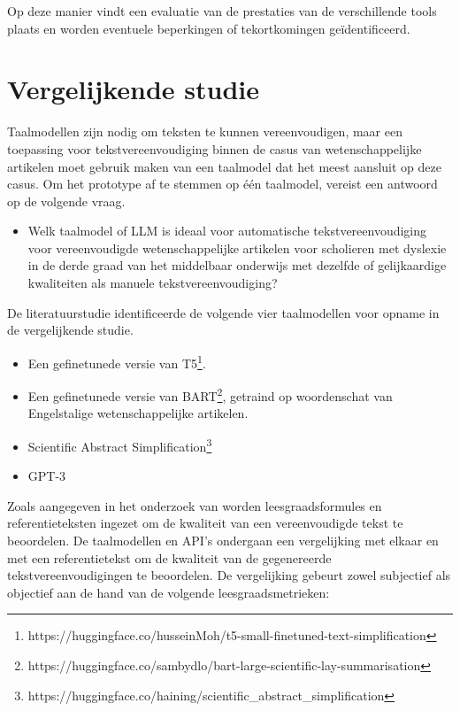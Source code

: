  Op deze manier vindt een evaluatie van de prestaties van de verschillende tools plaats en worden eventuele beperkingen of tekortkomingen geïdentificeerd. 

\section{Vergelijkende studie}
\label{sec:vergelijkende-studie}

Taalmodellen zijn nodig om teksten te kunnen vereenvoudigen, maar een toepassing voor tekstvereenvoudiging binnen de casus van wetenschappelijke artikelen moet gebruik maken van een taalmodel dat het meest aansluit op deze casus. Om het prototype af te stemmen op één taalmodel, vereist een antwoord op de volgende vraag. 

\begin{itemize}
	\item Welk taalmodel of LLM is ideaal voor automatische tekstvereenvoudiging voor vereenvoudigde wetenschappelijke artikelen voor scholieren met dyslexie in de derde graad van het middelbaar onderwijs met dezelfde of gelijkaardige kwaliteiten als manuele tekstvereenvoudiging?
\end{itemize}

De literatuurstudie identificeerde de volgende vier taalmodellen voor opname in de vergelijkende studie.

\begin{itemize}
	\item Een gefinetunede versie van T5\footnote{https://huggingface.co/husseinMoh/t5-small-finetuned-text-simplification}.
	\item Een gefinetunede versie van BART\footnote{https://huggingface.co/sambydlo/bart-large-scientific-lay-summarisation}, getraind op woordenschat van Engelstalige wetenschappelijke artikelen.
	\item Scientific Abstract Simplification\footnote{https://huggingface.co/haining/scientific\_abstract\_simplification}
	\item GPT-3
\end{itemize}

Zoals aangegeven in het onderzoek van \textcite{Nenkova2004} worden leesgraadsformules en referentieteksten ingezet om de kwaliteit van een vereenvoudigde tekst te beoordelen. De taalmodellen en API's ondergaan een vergelijking met elkaar en met een referentietekst om de kwaliteit van de gegenereerde tekstvereenvoudigingen te beoordelen. De vergelijking gebeurt zowel subjectief als objectief aan de hand van de volgende leesgraadsmetrieken: 

